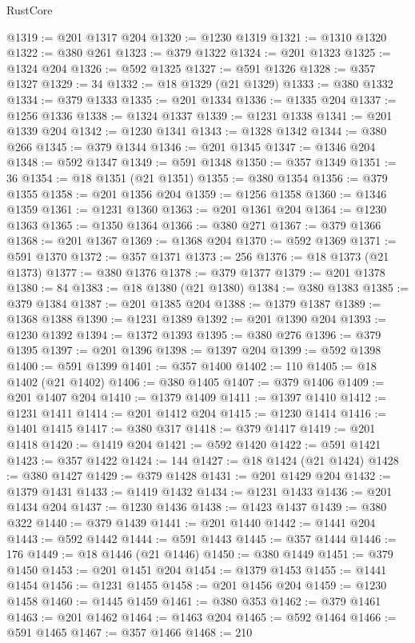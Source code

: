 \begin{lexlean}{RustCore}
\begin{coremodule}
@1319 := @201 @1317 @204
@1320 := @1230 @1319
@1321 := @1310 @1320
@1322 := @380 @261
@1323 := @379 @1322
@1324 := @201 @1323
@1325 := @1324 @204
@1326 := @592 @1325
@1327 := @591 @1326
@1328 := @357 @1327
@1329 := 34
@1332 := @18 @1329 (@21 @1329)
@1333 := @380 @1332
@1334 := @379 @1333
@1335 := @201 @1334
@1336 := @1335 @204
@1337 := @1256 @1336
@1338 := @1324 @1337
@1339 := @1231 @1338
@1341 := @201 @1339 @204
@1342 := @1230 @1341
@1343 := @1328 @1342
@1344 := @380 @266
@1345 := @379 @1344
@1346 := @201 @1345
@1347 := @1346 @204
@1348 := @592 @1347
@1349 := @591 @1348
@1350 := @357 @1349
@1351 := 36
@1354 := @18 @1351 (@21 @1351)
@1355 := @380 @1354
@1356 := @379 @1355
@1358 := @201 @1356 @204
@1359 := @1256 @1358
@1360 := @1346 @1359
@1361 := @1231 @1360
@1363 := @201 @1361 @204
@1364 := @1230 @1363
@1365 := @1350 @1364
@1366 := @380 @271
@1367 := @379 @1366
@1368 := @201 @1367
@1369 := @1368 @204
@1370 := @592 @1369
@1371 := @591 @1370
@1372 := @357 @1371
@1373 := 256
@1376 := @18 @1373 (@21 @1373)
@1377 := @380 @1376
@1378 := @379 @1377
@1379 := @201 @1378
@1380 := 84
@1383 := @18 @1380 (@21 @1380)
@1384 := @380 @1383
@1385 := @379 @1384
@1387 := @201 @1385 @204
@1388 := @1379 @1387
@1389 := @1368 @1388
@1390 := @1231 @1389
@1392 := @201 @1390 @204
@1393 := @1230 @1392
@1394 := @1372 @1393
@1395 := @380 @276
@1396 := @379 @1395
@1397 := @201 @1396
@1398 := @1397 @204
@1399 := @592 @1398
@1400 := @591 @1399
@1401 := @357 @1400
@1402 := 110
@1405 := @18 @1402 (@21 @1402)
@1406 := @380 @1405
@1407 := @379 @1406
@1409 := @201 @1407 @204
@1410 := @1379 @1409
@1411 := @1397 @1410
@1412 := @1231 @1411
@1414 := @201 @1412 @204
@1415 := @1230 @1414
@1416 := @1401 @1415
@1417 := @380 @317
@1418 := @379 @1417
@1419 := @201 @1418
@1420 := @1419 @204
@1421 := @592 @1420
@1422 := @591 @1421
@1423 := @357 @1422
@1424 := 144
@1427 := @18 @1424 (@21 @1424)
@1428 := @380 @1427
@1429 := @379 @1428
@1431 := @201 @1429 @204
@1432 := @1379 @1431
@1433 := @1419 @1432
@1434 := @1231 @1433
@1436 := @201 @1434 @204
@1437 := @1230 @1436
@1438 := @1423 @1437
@1439 := @380 @322
@1440 := @379 @1439
@1441 := @201 @1440
@1442 := @1441 @204
@1443 := @592 @1442
@1444 := @591 @1443
@1445 := @357 @1444
@1446 := 176
@1449 := @18 @1446 (@21 @1446)
@1450 := @380 @1449
@1451 := @379 @1450
@1453 := @201 @1451 @204
@1454 := @1379 @1453
@1455 := @1441 @1454
@1456 := @1231 @1455
@1458 := @201 @1456 @204
@1459 := @1230 @1458
@1460 := @1445 @1459
@1461 := @380 @353
@1462 := @379 @1461
@1463 := @201 @1462
@1464 := @1463 @204
@1465 := @592 @1464
@1466 := @591 @1465
@1467 := @357 @1466
@1468 := 210

\end{coremodule}
\end{lexlean}

